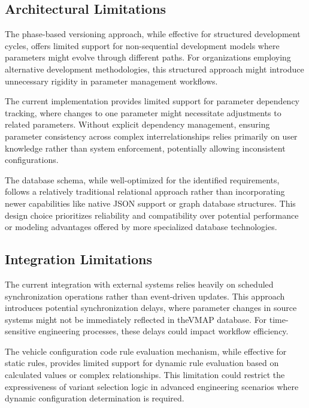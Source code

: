 \subsection{Architectural Limitations}
\label{subsec:architectural-limitations}

The phase-based versioning approach, while effective for structured development cycles, offers limited support for non-sequential development models where parameters might evolve through different paths. For organizations employing alternative development methodologies, this structured approach might introduce unnecessary rigidity in parameter management workflows.

The current implementation provides limited support for parameter dependency tracking, where changes to one parameter might necessitate adjustments to related parameters. Without explicit dependency management, ensuring parameter consistency across complex interrelationships relies primarily on user knowledge rather than system enforcement, potentially allowing inconsistent configurations.

The database schema, while well-optimized for the identified requirements, follows a relatively traditional relational approach rather than incorporating newer capabilities like native JSON support or graph database structures. This design choice prioritizes reliability and compatibility over potential performance or modeling advantages offered by more specialized database technologies.

\subsection{Integration Limitations}
\label{subsec:integration-limitations}

The current integration with external systems relies heavily on scheduled synchronization operations rather than event-driven updates. This approach introduces potential synchronization delays, where parameter changes in source systems might not be immediately reflected in the\ac{VMAP} database. For time-sensitive engineering processes, these delays could impact workflow efficiency.

The vehicle configuration code rule evaluation mechanism, while effective for static rules, provides limited support for dynamic rule evaluation based on calculated values or complex relationships. This limitation could restrict the expressiveness of variant selection logic in advanced engineering scenarios where dynamic configuration determination is required.

